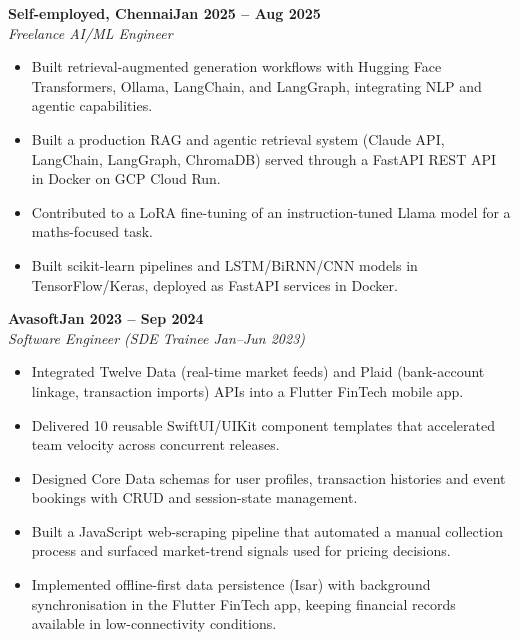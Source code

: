 \documentclass[a4paper,11pt]{article}
\newcommand{\entry}[4]{\needspace{4\baselineskip}\noindent\textbf{#1}\hfill\textbf{#2}\\ \textit{#3}\hfill\textit{#4}\par}
\begin{document}
\vspace{4pt}
\entry{Self-employed, Chennai}{Jan 2025 – Aug 2025}{Freelance AI/ML Engineer}{}
\begin{itemize}
  \item Built retrieval-augmented generation workflows with Hugging Face Transformers, Ollama, LangChain, and LangGraph, integrating NLP and agentic capabilities.
  \item Built a production RAG and agentic retrieval system (Claude API, LangChain, LangGraph, ChromaDB) served through a FastAPI REST API in Docker on GCP Cloud Run.
  \item Contributed to a LoRA fine-tuning of an instruction-tuned Llama model for a maths-focused task.
  \item Built scikit-learn pipelines and LSTM/BiRNN/CNN models in TensorFlow/Keras, deployed as FastAPI services in Docker.
\end{itemize}
\vspace{4pt}
\entry{Avasoft}{Jan 2023 – Sep 2024}{Software Engineer (SDE Trainee Jan–Jun 2023)}{}
\begin{itemize}
  \item Integrated Twelve Data (real-time market feeds) and Plaid (bank-account linkage, transaction imports) APIs into a Flutter FinTech mobile app.
  \item Delivered 10 reusable SwiftUI/UIKit component templates that accelerated team velocity across concurrent releases.
  \item Designed Core Data schemas for user profiles, transaction histories and event bookings with CRUD and session-state management.
  \item Built a JavaScript web-scraping pipeline that automated a manual collection process and surfaced market-trend signals used for pricing decisions.
  \item Implemented offline-first data persistence (Isar) with background synchronisation in the Flutter FinTech app, keeping financial records available in low-connectivity conditions.
\end{itemize}

\end{document}
